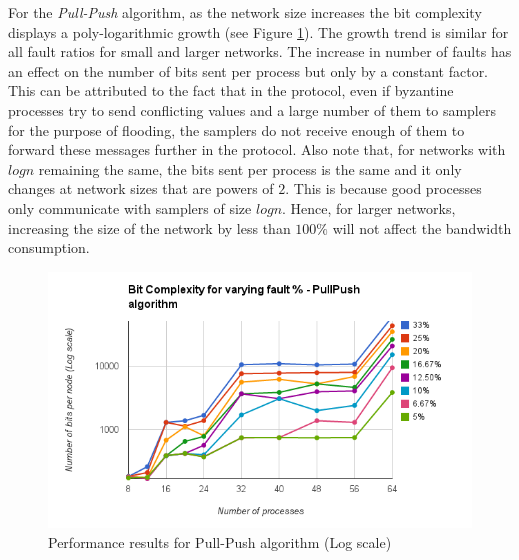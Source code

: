 For the \textit{Pull-Push} algorithm, as the network size increases the bit complexity displays a poly-logarithmic growth (see Figure \ref{fig:pull_push}). The growth trend is similar for all fault ratios for small and larger networks. The increase in number of faults has an effect on the number of bits sent per process but only by a constant factor. This can be attributed to the fact that in the protocol, even if byzantine processes try to send conflicting values and a large number of them to samplers for the purpose of flooding, the samplers do not receive enough of them to forward these messages further in the protocol. Also note that, for networks with $logn$ remaining the same, the bits sent per process is the same and it only changes at network sizes that are powers of $2$. This is because good processes only communicate with samplers of size $logn$. Hence, for larger networks, increasing the size of the network by less than $100\%$ will not affect the bandwidth consumption.
\begin{figure}[ht]
 \centering
\includegraphics[scale=0.4]{pull_push}
\caption{Performance results for Pull-Push algorithm (Log scale)}
 \label{fig:pull_push}
\vspace{-2mm}
\end{figure}

